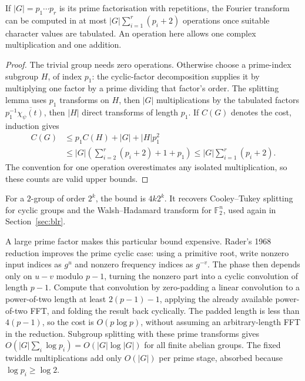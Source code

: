 \begin{theorem}\label{thm:fftgeneral}
If $|G|=p_1\cdots p_r$ is its prime factorisation with repetitions, the Fourier transform can be computed in at most $|G|\sum_{i=1}^r(p_i+2)$ operations once suitable character values are tabulated. An operation here allows one complex multiplication and one addition.
\end{theorem}
\begin{proof}
The trivial group needs zero operations. Otherwise choose a prime-index subgroup $H$, of index $p_1$: the cyclic-factor decomposition supplies it by multiplying one factor by a prime dividing that factor's order. The splitting lemma uses $p_1$ transforms on $H$, then $|G|$ multiplications by the tabulated factors $p_1^{-1}\overline{\chi_\psi(t)}$, then $|H|$ direct transforms of length $p_1$. If $C(G)$ denotes the cost, induction gives
\[
\begin{aligned}
C(G)&\le p_1C(H)+|G|+|H|p_1^2\\
&\le|G|\left(\sum_{i=2}^r(p_i+2)+1+p_1\right)
\le|G|\sum_{i=1}^r(p_i+2).
\end{aligned}
\]
The convention for one operation overestimates any isolated multiplication, so these counts are valid upper bounds.
\end{proof}

For a $2$-group of order $2^k$, the bound is $4k2^k$. It recovers Cooley--Tukey splitting for cyclic groups and the Walsh--Hadamard transform for $\mathbb F_2^n$, used again in Section~\ref{sec:blr}.


A large prime factor makes this particular bound expensive. Rader's 1968 reduction improves the prime cyclic case: using a primitive root, write nonzero input indices as $g^u$ and nonzero frequency indices as $g^{-v}$. The phase then depends only on $u-v$ modulo $p-1$, turning the nonzero part into a cyclic convolution of length $p-1$. Compute that convolution by zero-padding a linear convolution to a power-of-two length at least $2(p-1)-1$, applying the already available power-of-two FFT, and folding the result back cyclically. The padded length is less than $4(p-1)$, so the cost is $O(p\log p)$, without assuming an arbitrary-length FFT in the reduction. Subgroup splitting with these prime transforms gives $O(|G|\sum_i\log p_i)=O(|G|\log|G|)$ for all finite abelian groups. The fixed twiddle multiplications add only $O(|G|)$ per prime stage, absorbed because $\log p_i\ge\log2$.

